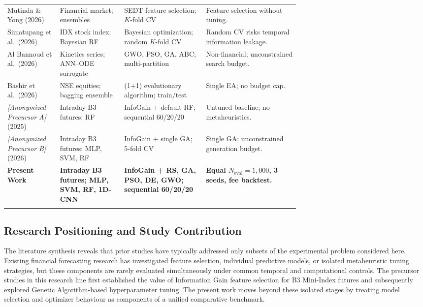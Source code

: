 \begin{table}[!htbp]
\begin{tabularx}{\linewidth}{@{}>{\raggedright\arraybackslash}p{0.18\linewidth} >{\raggedright\arraybackslash}p{0.22\linewidth} >{\raggedright\arraybackslash}p{0.29\linewidth} >{\raggedright\arraybackslash}X@{}}
Mutinda \& Yong (2026) \cite{mutinda2026hybrid} & Financial market; ensembles & SEDT feature selection; $K$-fold CV & Feature selection without tuning. \\
Simatupang et al.\ (2026) \cite{simatupang2026stock} & IDX stock index; Bayesian RF & Bayesian optimization; random $K$-fold CV & Random CV risks temporal information leakage. \\
Al Bannoud et al.\ (2026) \cite{al_bannoud2026accelerating} & Kinetics series; ANN--ODE surrogate & GWO, PSO, GA, ABC; multi-partition & Non-financial; unconstrained search budget. \\
Bashir et al.\ (2026) \cite{bashir2026evobagnet} & NSE equities; bagging ensemble & (1+1) evolutionary algorithm; train/test & Single EA; no budget cap. \\
\textit{[Anonymized Precursor A]} (2025) \cite{anonymous2025precursor} & Intraday B3 futures; RF & InfoGain + default RF; sequential 60/20/20 & Untuned baseline; no metaheuristics. \\
\textit{[Anonymized Precursor B]} (2026) \cite{anonymous2026precursor} & Intraday B3 futures; MLP, SVM, RF & InfoGain + single GA; 5-fold CV & Single GA; unconstrained generation budget. \\
\textbf{Present Work} & \textbf{Intraday B3 futures; MLP, SVM, RF, 1D-CNN} & \textbf{InfoGain + RS, GA, PSO, DE, GWO; sequential 60/20/20} & \textbf{Equal $N_{\mathrm{eval}}=1{,}000$, 3 seeds, fee backtest.} \\
\botrule
\end{tabularx}
\end{table}
\FloatBarrier

\subsection{Research Positioning and Study Contribution}\label{sec:research_positioning}

The literature synthesis reveals that prior studies have typically addressed only subsets of the experimental problem considered here. Existing financial forecasting research has investigated feature selection, individual predictive models, or isolated metaheuristic tuning strategies, but these components are rarely evaluated simultaneously under common temporal and computational controls. The precursor studies in this research line first established the value of Information Gain feature selection for B3 Mini-Index futures and subsequently explored Genetic Algorithm-based hyperparameter tuning. The present work moves beyond these isolated stages by treating model selection and optimizer behaviour as components of a unified comparative benchmark.

